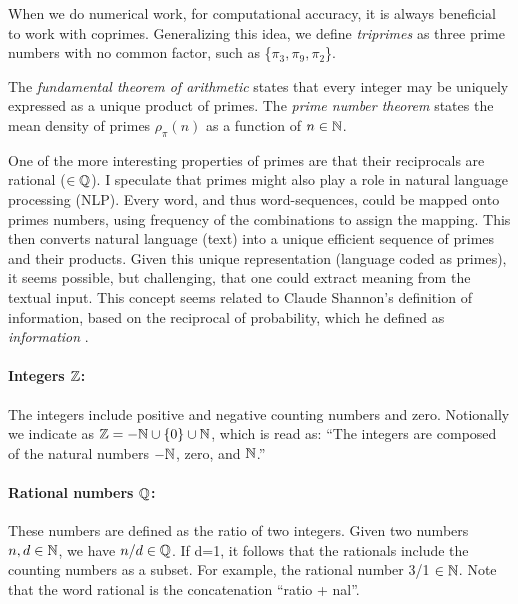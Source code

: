 \documentclass{ximera}
\begin{document}
When we do numerical work, for computational accuracy, it is always beneficial to work with coprimes.
Generalizing this idea, we define \emph{triprimes} as three prime numbers with no common factor,
such as \{$\pi_3, \pi_9, \pi_2$\}.

The \emph{fundamental theorem of arithmetic} states that every integer may be uniquely expressed as a unique product
of primes.  The \emph{prime number theorem} states the mean density of primes $\rho_\pi(n)$ as a function of $n\in\mathbb{N}$.

One of the more interesting properties of primes are that their reciprocals are rational ($\in\mathbb{Q}$).
 {\magenta
 I speculate that primes might also play a role in natural language processing (NLP).
 Every word, and thus word-sequences, could be mapped onto primes numbers, using frequency of the combinations to assign the mapping. This then converts natural language (text) into a unique efficient sequence of primes and their products. 
Given this unique representation (language coded as primes), it seems possible, but challenging,
that one could extract meaning from the textual input.
This concept seems related to Claude Shannon's definition of information, based on the reciprocal of probability, which he defined as \emph{information} \citep{Allen94a}.
	}
	
\paragraph{Integers $\mathbb{Z}$: \label{page:bbZ} }
The integers include positive and negative counting numbers and zero.  Notionally we indicate as
{$\mathbb{Z} = -\mathbb{N} \cup \{0\} \cup \mathbb{N}$}, which is read as:
 ``The integers are composed of the natural numbers $-\mathbb{N}$, zero, and $\mathbb{N}$.'' 
 

\paragraph{Rational numbers $\mathbb{Q}$: \label{page:bbQ} }
These numbers are defined as the ratio of two integers.  Given two numbers $n, d \in \mathbb{N}$,
we have $n/d \in \mathbb{Q}$.  If d=1, it follows that the rationals include the counting numbers as a subset. 
For example, the rational number 3/1 $\in \mathbb{N}$. 
Note that the word rational is the concatenation ``ratio + nal''.
\end{document}
